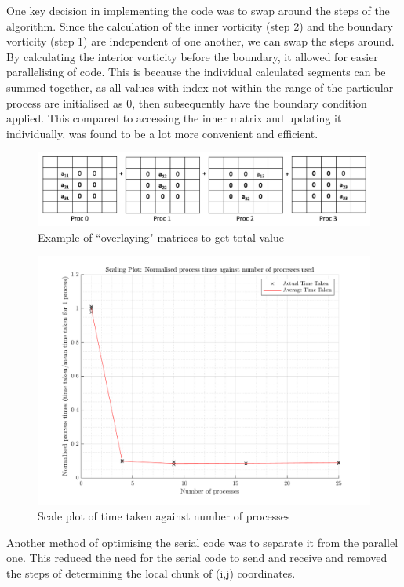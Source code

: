\documentclass[11pt]{article}
\begin{document}
	\vspace{0.3cm}
	One key decision in implementing the code was to swap around the steps of the algorithm. Since the calculation of the inner vorticity (step 2) and the boundary vorticity (step 1) are independent of one another, we can swap the steps around. By calculating the interior vorticity before the boundary, it allowed for easier parallelising of code. This is because the individual calculated segments can be summed together, as all values with index not within the range of the particular process are initialised as 0, then subsequently have the boundary condition applied. This compared to accessing the inner matrix and updating it individually, was found to be a lot more convenient and efficient. 
		
	\begin{figure}[htb]
		\centering
		\includegraphics[width=\linewidth]{vorticity.jpg} 
	   	\caption{Example of ``overlaying" matrices to get total value}
	   	\label{fig:overlaying_example}
	\end{figure}
	
		\begin{figure}
            \centering
		\includegraphics[width=\linewidth]{../Images/scaleplot.png} 
	   	\caption{Scale plot of time taken against number of processes}
	   	\label{fig:scaleplot}
        \end{figure}
        Another method of optimising the serial code was to separate it from the parallel one. This reduced the need for the serial code to send and receive and removed the steps of determining the local chunk of (i,j) coordinates. 
        
\end{document}
